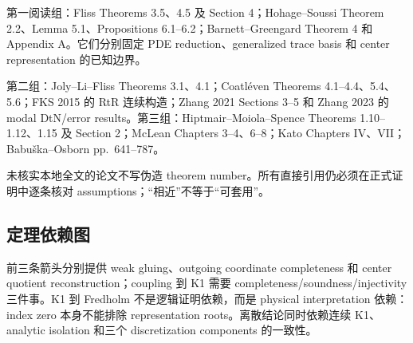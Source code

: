 \documentclass[UTF8,11pt,fontset=none]{ctexart}
\theoremstyle{definition}
\begin{document}
第一阅读组：Fliss Theorems 3.5、4.5 及 Section 4；Hohage--Soussi Theorem 2.2、Lemma 5.1、Propositions 6.1--6.2；Barnett--Greengard Theorem 4 和 Appendix A。它们分别固定 PDE reduction、generalized trace basis 和 center representation 的已知边界。

第二组：Joly--Li--Fliss Theorems 3.1、4.1；Coatléven Theorems 4.1--4.4、5.4、5.6；FKS 2015 的 RtR 连续构造；Zhang 2021 Sections 3--5 和 Zhang 2023 的 modal DtN/error results。第三组：Hiptmair--Moiola--Spence Theorems 1.10--1.12、1.15 及 Section 2；McLean Chapters 3--4、6--8；Kato Chapters IV、VII；Babuška--Osborn pp.~641--787。

未核实本地全文的论文不写伪造 theorem number。所有直接引用仍必须在正式证明中逐条核对 assumptions；“相近”不等于“可套用”。

\subsection{定理依赖图}

\begin{center}
\end{center}

前三条箭头分别提供 weak gluing、outgoing coordinate completeness 和 center quotient reconstruction；coupling 到 K1 需要 completeness/soundness/injectivity 三件事。K1 到 Fredholm 不是逻辑证明依赖，而是 physical interpretation 依赖：index zero 本身不能排除 representation roots。离散结论同时依赖连续 K1、analytic isolation 和三个 discretization components 的一致性。
\end{document}
